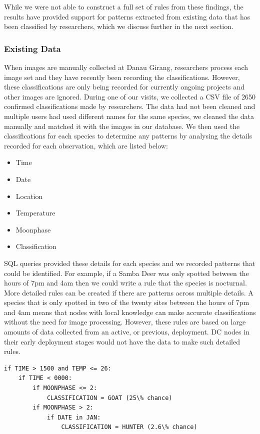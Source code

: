			While we were not able to construct a full set of rules from these findings, the results have provided support for patterns extracted from existing data that has been classified by researchers, which we discuss further in the next section. 
			
			\subsubsection{Existing Data}
			When images are manually collected at Danau Girang, researchers process each image set and they have recently been recording the classifications. However, these classifications are only being recorded for currently ongoing projects and other images are ignored. During one of our visits, we collected a CSV file of 2650 confirmed classifications made by researchers. The data had not been cleaned and multiple users had used different names for the same species, we cleaned the data manually and matched it with the images in our database.
			We then used the classifications for each species to determine any patterns by analysing the details recorded for each observation, which are listed below:
			\begin{itemize}
				\item Time
				\item Date
				\item Location
				\item Temperature
				\item Moonphase
				\item Classification
			\end{itemize}
			
			SQL queries provided these details for each species and we recorded patterns that could be identified. For example, if a Samba Deer was only spotted between the hours of 7pm and 4am then we could write a rule that the species is nocturnal. More detailed rules can be created if there are patterns across multiple details. A species that is only spotted in two of the twenty sites between the hours of 7pm and 4am means that nodes with local knowledge can make accurate classifications without the need for image processing. However, these rules are based on large amounts of data collected from an active, or previous, deployment. DC nodes in their early deployment stages would not have the data to make such detailed rules.

				\begin{lstlisting}[breaklines=true, caption={Example Rule created from Existing Data}, label={imp:lst:rule1}]
if TIME > 1500 and TEMP <= 26:
    if TIME < 0000:
        if MOONPHASE <= 2:
            CLASSIFICATION = GOAT (25\% chance)
        if MOONPHASE > 2:
            if DATE in JAN:
                CLASSIFICATION = HUNTER (2.6\% chance)
				\end{lstlisting}
			
